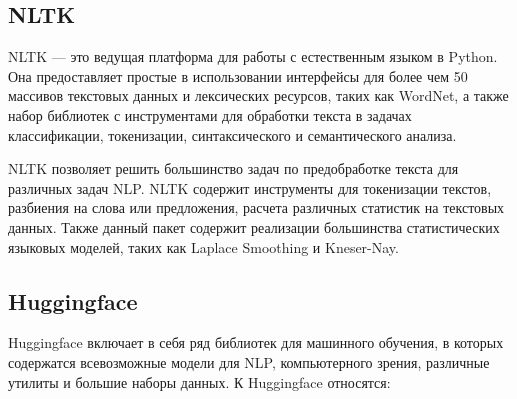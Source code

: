\subsection{NLTK}

NLTK --- это ведущая платформа для работы с естественным языком в Python. Она предоставляет простые в использовании интерфейсы для более чем 50 массивов текстовых данных и лексических ресурсов, таких как WordNet, а также набор библиотек с инструментами для обработки текста в задачах классификации, токенизации, синтаксического и семантического анализа.

NLTK позволяет решить большинство задач по предобработке текста для различных задач NLP. NLTK содержит инструменты для токенизации текстов, разбиения на слова или предложения, расчета различных статистик на текстовых данных. Также данный пакет содержит реализации большинства статистических языковых моделей, таких как Laplace Smoothing и Kneser-Nay.

\subsection{Huggingface}

Huggingface включает в себя ряд библиотек для машинного обучения, в которых содержатся всевозможные модели для NLP, компьютерного зрения, различные утилиты и большие наборы данных. К Huggingface относятся:


